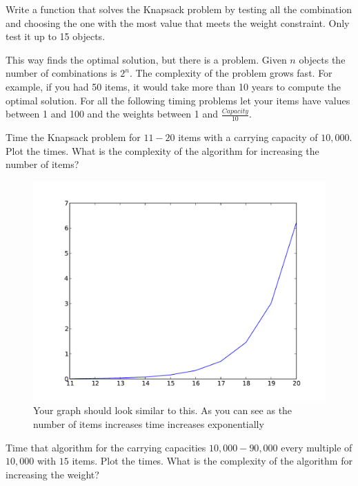 \begin{problem}
Write a function that solves the Knapsack problem by testing all the combination and choosing the one with the most value that meets the weight constraint. Only test it up to 15 objects.
\end{problem}

This way finds the optimal solution, but there is a problem. Given $n$ objects the number of combinations is $2^n$. The complexity of the problem grows fast. For example, if you had 50 items, it would take more than 10 years to compute the optimal solution. For all the following timing problems let your items have values between 1 and 100 and the weights between 1 and $\frac{Capacity}{10}$.

\begin{problem}
Time the Knapsack problem for $11-20$ items with a carrying capacity of $10,000$. Plot the times. What is the complexity of the algorithm for increasing the number of items?
\end{problem}

\begin{figure}[H]
\includegraphics[scale = .5]{naiveTime.pdf}
\caption{Your graph should look similar to this. As you can see as the number of items increases time increases exponentially}
\end{figure}

\begin{problem}
Time that algorithm for the carrying capacities $10,000-90,000$ every multiple of $10,000$ with $15$ items. Plot the times. What is the complexity of the algorithm for increasing the weight?
\end{problem}

